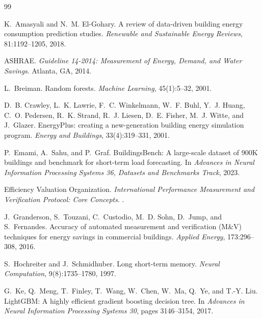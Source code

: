 \documentclass[11pt,a4paper]{article}
\begin{document}
\small
\begin{thebibliography}{99}\setlength{\itemsep}{0.15em}

K.~Amasyali and N.~M. El-Gohary.
\newblock A review of data-driven building energy consumption prediction studies.
\newblock \emph{Renewable and Sustainable Energy Reviews}, 81:1192--1205, 2018.

ASHRAE.
\newblock \emph{Guideline 14-2014: Measurement of Energy, Demand, and Water Savings}.
\newblock Atlanta, GA, 2014.

L.~Breiman.
\newblock Random forests.
\newblock \emph{Machine Learning}, 45(1):5--32, 2001.

D.~B. Crawley, L.~K. Lawrie, F.~C. Winkelmann, W.~F. Buhl, Y.~J. Huang, C.~O. Pedersen, R.~K. Strand, R.~J. Liesen,
D.~E. Fisher, M.~J. Witte, and J.~Glazer.
\newblock EnergyPlus: creating a new-generation building energy simulation program.
\newblock \emph{Energy and Buildings}, 33(4):319--331, 2001.

P.~Emami, A.~Sahu, and P.~Graf.
\newblock BuildingsBench: A large-scale dataset of 900K buildings and benchmark for short-term load forecasting.
\newblock In \emph{Advances in Neural Information Processing Systems 36, Datasets and Benchmarks Track}, 2023.

Efficiency Valuation Organization.
\newblock \emph{International Performance Measurement and Verification Protocol: Core Concepts}.
.

J.~Granderson, S.~Touzani, C.~Custodio, M.~D. Sohn, D.~Jump, and S.~Fernandes.
\newblock Accuracy of automated measurement and verification (M\&V) techniques for energy savings in commercial
buildings.
\newblock \emph{Applied Energy}, 173:296--308, 2016.

S.~Hochreiter and J.~Schmidhuber.
\newblock Long short-term memory.
\newblock \emph{Neural Computation}, 9(8):1735--1780, 1997.

G.~Ke, Q.~Meng, T.~Finley, T.~Wang, W.~Chen, W.~Ma, Q.~Ye, and T.-Y. Liu.
\newblock LightGBM: A highly efficient gradient boosting decision tree.
\newblock In \emph{Advances in Neural Information Processing Systems 30}, pages 3146--3154, 2017.


\end{thebibliography}
\end{document}
